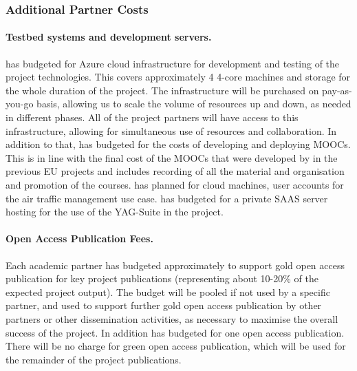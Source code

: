 \documentclass[a4paper,11pt]{article}
\begin{document}

\subsubsection{Additional Partner Costs}
\vspace{-6pt}

\paragraph{Testbed systems and development servers.}
\UODshort{} has budgeted  for Azure cloud infrastructure for development and testing of the project technologies. This covers approximately 4 4-core machines and storage for the whole duration of the project. The infrastructure will be purchased on pay-as-you-go basis, allowing us to scale the volume of resources up and down, as needed in different phases. All of the project partners will have access to this infrastructure, allowing for simultaneous use of resources and collaboration. In addition to that, \UODshort{} has budgeted  for the costs of developing and deploying MOOCs. This is in line with the final cost of the MOOCs that were developed by \UODshort{} in the previous EU projects and includes recording of all the material and organisation and promotion of the courses. \FRQshort{} has planned  for cloud machines, user accounts for the air traffic management use case. \YAGshort has budgeted  for a private SAAS server hosting for the use of the  YAG-Suite in the project. %

\paragraph{Open Access Publication Fees.}
Each academic partner has budgeted approximately  to support gold open access publication for key project publications (representing about 10-20\% of the expected project output). The budget will be pooled if not used by a specific partner, and used to support further gold open access publication by other partners or other dissemination activities, as necessary to maximise the overall success of the project. In addition \FRQshort{} has budgeted  for one open access publication. There will be no charge for green open access publication, which will be used for the remainder of the project publications.
\end{document}
